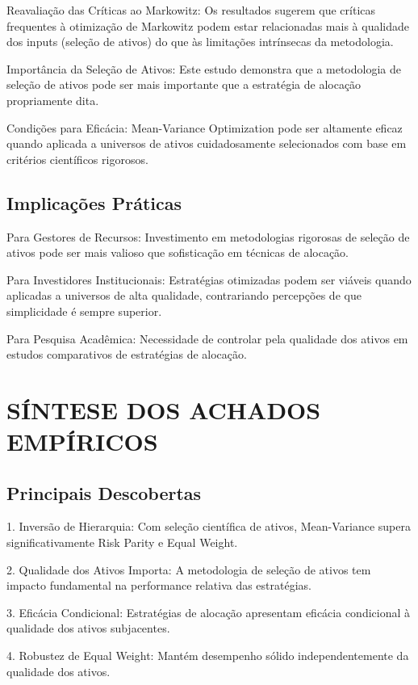 Reavaliação das Críticas ao Markowitz: Os resultados sugerem que críticas frequentes à otimização de Markowitz podem estar relacionadas mais à qualidade dos inputs (seleção de ativos) do que às limitações intrínsecas da metodologia.

Importância da Seleção de Ativos: Este estudo demonstra que a metodologia de seleção de ativos pode ser mais importante que a estratégia de alocação propriamente dita.

Condições para Eficácia: Mean-Variance Optimization pode ser altamente eficaz quando aplicada a universos de ativos cuidadosamente selecionados com base em critérios científicos rigorosos.

\subsection{Implicações Práticas}

Para Gestores de Recursos: Investimento em metodologias rigorosas de seleção de ativos pode ser mais valioso que sofisticação em técnicas de alocação.

Para Investidores Institucionais: Estratégias otimizadas podem ser viáveis quando aplicadas a universos de alta qualidade, contrariando percepções de que simplicidade é sempre superior.

Para Pesquisa Acadêmica: Necessidade de controlar pela qualidade dos ativos em estudos comparativos de estratégias de alocação.

\section{SÍNTESE DOS ACHADOS EMPÍRICOS}

\subsection{Principais Descobertas}

1. Inversão de Hierarquia: Com seleção científica de ativos, Mean-Variance supera significativamente Risk Parity e Equal Weight.

2. Qualidade dos Ativos Importa: A metodologia de seleção de ativos tem impacto fundamental na performance relativa das estratégias.

3. Eficácia Condicional: Estratégias de alocação apresentam eficácia condicional à qualidade dos ativos subjacentes.

4. Robustez de Equal Weight: Mantém desempenho sólido independentemente da qualidade dos ativos.

